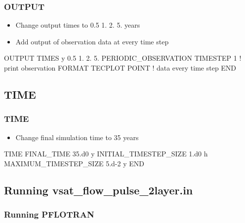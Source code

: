 \documentclass{beamer}
\newcommand\bluecomment[1]{{{\color{blue} #1}}}
\newcommand\magentacomment[1]{{{\color{magenta} #1}}}
\begin{document}
\begin{frame}[fragile]\frametitle{OUTPUT}

\begin{itemize}
\item Change output times to 0.5 1. 2. 5. years
\item Add output of observation data at every time step
\end{itemize}


\begin{semiverbatim}

OUTPUT
  \magentacomment{TIMES y 0.5 1. 2. 5.}   
  \magentacomment{PERIODIC_OBSERVATION TIMESTEP 1} \bluecomment{! print observation}
  FORMAT TECPLOT POINT            \bluecomment{!   data every time step}
END

\end{semiverbatim}

\end{frame}

\subsection{TIME}

\begin{frame}[fragile]\frametitle{TIME}

\begin{itemize}
\item Change final simulation time to 35 years
\end{itemize}

\begin{semiverbatim}

TIME
  FINAL_TIME \magentacomment{35.d0} y
  INITIAL_TIMESTEP_SIZE 1.d0 h
  MAXIMUM_TIMESTEP_SIZE 5.d-2 y
END

\end{semiverbatim}

\end{frame}

\subsection{Running vsat_flow_pulse_2layer.in}

\begin{frame}[fragile]\frametitle{Running PFLOTRAN}


\end{frame}
\end{document}
